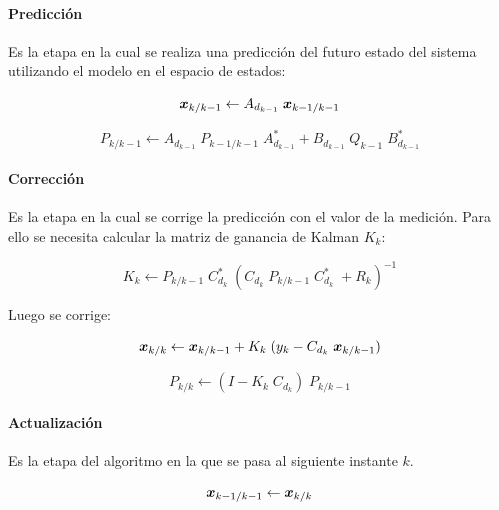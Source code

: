 			\paragraph{Predicción}
				Es la etapa en la cual se realiza una predicción del futuro estado del sistema utilizando el modelo en el espacio de estados:
				
				\begin{equation*}
					\boldsymbol{x}_{k/k - 1} \leftarrow A_{d_{k - 1}} \; \boldsymbol{x}_{k - 1/k - 1}
				\end{equation*}
				
				\begin{equation*}
					P_{k/k - 1} \leftarrow A_{d_{k - 1}}\; P_{k - 1 / k - 1}\; A_{d_{k - 1}}^{*} + B_{d_{k - 1}}\; Q_{k - 1}\; B_{d_{k - 1}}^{*}
				\end{equation*}
			\paragraph{Corrección}
				Es la etapa en la cual se corrige la predicción con el valor de la medición. Para ello se necesita calcular la matriz de ganancia de Kalman $K_{k}$:
				
				\begin{equation*}
					K_{k} \leftarrow P_{k / k - 1}\; C_{d_{k}}^{*}\; (C_{d_{k}}\; P_{k/k - 1}\; C_{d_{k}}^{*}\; + R_{k})^{-1}
				\end{equation*}
				
				Luego se corrige:
				
				\begin{equation*}
					\boldsymbol{x}_{k/k} \leftarrow \boldsymbol{x}_{k/k - 1} + K_{k}\; (y_{k} - C_{d_{k}}\; \boldsymbol{x}_{k/k - 1})
				\end{equation*}
				
				\begin{equation*}
					P_{k/k} \leftarrow (I - K_{k}\; C_{d_{k}})\; P_{k/k - 1}
				\end{equation*}
					
			\paragraph{Actualización}
				Es la etapa del algoritmo en la que se pasa al siguiente instante $k$.
				
				\begin{equation*}
					\boldsymbol{x}_{k - 1/k - 1} \leftarrow \boldsymbol{x}_{k/k}
				\end{equation*}
				
